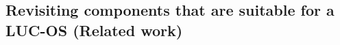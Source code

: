 \subsection{Revisiting components that are suitable for a LUC-OS (Related work)}
\label{sub:sec:revisiting_openstack}











				
